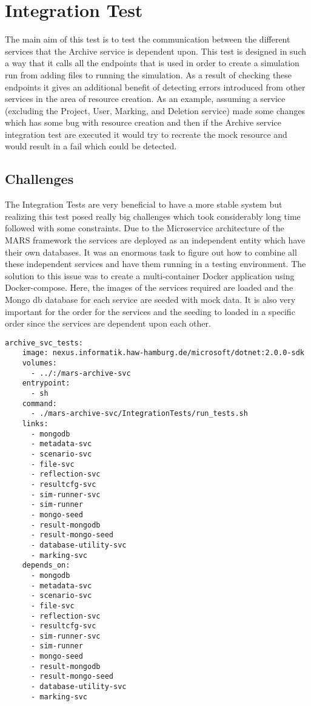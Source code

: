\section{Integration Test}
The main aim of this test is to test the communication between the different services that the Archive service is dependent upon. This test is designed in 
such a way that it calls all the endpoints that is used in order to create a simulation run from adding files to running the simulation. As a result of checking
these endpoints it gives an additional benefit of detecting errors introduced from other services in the area of resource creation. As an example, assuming a service
(excluding the Project, User, Marking, and Deletion service)
made some changes which has some bug with resource creation and then if the Archive service integration test are executed it would try to recreate the mock resource
and would result in a fail which could be detected.

\subsection{Challenges}
The Integration Tests are very beneficial to have a more stable system but realizing this test posed really big challenges which took considerably long time followed 
with some constraints. Due to the Microservice architecture of the MARS framework the services are deployed as an independent entity which have their own databases.
It was an enormous task to figure out how to combine all these independent services and have them running in a testing environment. The solution to this issue
was to create a multi-container Docker application using Docker-compose. Here, the images of the services required are loaded and the Mongo db database for each
service are seeded with mock data. It is also very important for the order for the services and the seeding to loaded in a specific order since the services are dependent upon
each other.  

\begin{lstlisting}[language=docker-compose,caption={Docker compose configuration snippet for Archive service Integration Test}, captionpos=b, breaklines=true,label={code:integCompose}]
archive_svc_tests:
    image: nexus.informatik.haw-hamburg.de/microsoft/dotnet:2.0.0-sdk
    volumes:
      - ../:/mars-archive-svc
    entrypoint:
      - sh
    command:
      - ./mars-archive-svc/IntegrationTests/run_tests.sh
    links:
      - mongodb
      - metadata-svc
      - scenario-svc
      - file-svc
      - reflection-svc
      - resultcfg-svc
      - sim-runner-svc
      - sim-runner
      - mongo-seed
      - result-mongodb
      - result-mongo-seed
      - database-utility-svc
      - marking-svc
    depends_on:
      - mongodb
      - metadata-svc
      - scenario-svc
      - file-svc
      - reflection-svc
      - resultcfg-svc
      - sim-runner-svc
      - sim-runner
      - mongo-seed
      - result-mongodb
      - result-mongo-seed
      - database-utility-svc
      - marking-svc
\end{lstlisting}      

